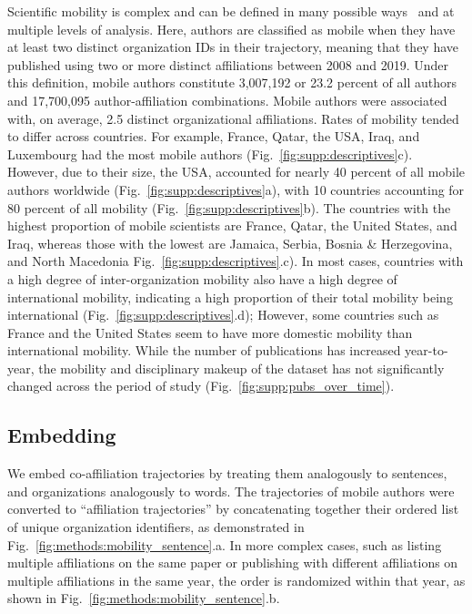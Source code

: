\documentclass[12pt]{article} %
\begin{document}
Scientific mobility is complex and can be defined in many possible ways~\autocite{robinson2019mobility} and at multiple levels of analysis.
Here, authors are classified as mobile when they have at least two distinct organization IDs in their trajectory, meaning that they have published using two or more distinct affiliations between 2008 and 2019.
Under this definition, mobile authors constitute 3,007,192 or 23.2 percent of all authors and 17,700,095 author-affiliation combinations.
Mobile authors were associated with, on average, 2.5 distinct organizational affiliations.
Rates of mobility tended to differ across countries.
For example, France, Qatar, the USA, Iraq, and Luxembourg had the most mobile authors (Fig.~\ref{fig:supp:descriptives}c).
However, due to their size, the USA, accounted for nearly 40 percent of all mobile authors worldwide (Fig.~\ref{fig:supp:descriptives}a), with 10 countries accounting for 80 percent of all mobility (Fig.~\ref{fig:supp:descriptives}b).
The countries with the highest proportion of mobile scientists are France, Qatar, the United States, and Iraq, whereas those with the lowest are Jamaica, Serbia, Bosnia \& Herzegovina, and North Macedonia Fig.~\ref{fig:supp:descriptives}.c).
In most cases, countries with a high degree of inter-organization mobility also have a high degree of international mobility, indicating a high proportion of their total mobility being international (Fig.~\ref{fig:supp:descriptives}.d);
However, some countries such as France and the United States seem to have more domestic mobility than international mobility. 
While the number of publications has increased year-to-year, the mobility and disciplinary makeup of the dataset has not significantly changed across the period of study (Fig.~\ref{fig:supp:pubs_over_time}).




\subsection*{Embedding}
We embed co-affiliation trajectories by treating them analogously to sentences, and organizations analogously to words.
The trajectories of mobile authors were converted to ``affiliation trajectories'' by concatenating together their ordered list of unique organization identifiers, as demonstrated in Fig.~\ref{fig:methods:mobility_sentence}.a.
In more complex cases, such as listing multiple affiliations on the same paper or publishing with different affiliations on multiple affiliations in the same year, the order is randomized within that year, as shown in  Fig.~\ref{fig:methods:mobility_sentence}.b.
\end{document}
